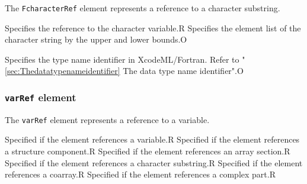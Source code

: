 The {\tt FcharacterRef} element represents a reference to a character substring.


\begin{XcodeMLChildElements}
{Specifies the reference to the character variable.}{R}
{Specifies the element list of the character string by the upper and lower bounds.}{O}
\end{XcodeMLChildElements}

\begin{XcodeMLAttributes}
{Specifies the type name identifier in XcodeML/Fortran.
 Refer to "\ref{sec:Thedatatypenameidentifier} The data type name identifier".}{O}
\end{XcodeMLAttributes}


\subsubsection{ {\tt varRef} element}

The {\tt varRef} element represents a reference to a variable.


\begin{XcodeMLChildElements}
{Specified if the element references a variable.}{R}
{Specified if the element references a structure component.}{R}
{Specified if the element references an array section.}{R}
{Specified if the element references a character substring.}{R}
{Specified if the element references a coarray.}{R}
{Specified if the element references a complex part.}{R}
\end{XcodeMLChildElements}

